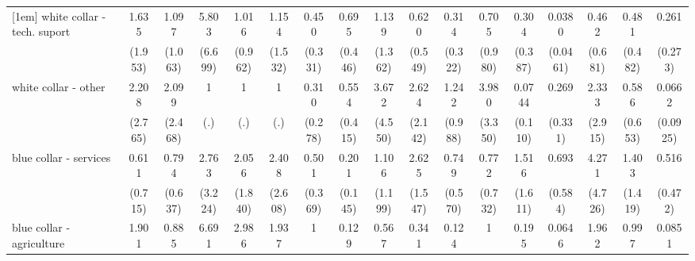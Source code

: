 {\begin{tabular}{l*{16}{c}}
[1em]
white collar - tech. suport&       1.635         &       1.097         &       5.803         &       1.016         &       1.154         &       0.450         &       0.695         &       1.139         &       0.620         &       0.314         &       0.705         &       0.304         &      0.0380\sym{**} &       0.462         &       0.481         &       0.261         \\
                    &     (1.953)         &     (1.063)         &     (6.699)         &     (0.962)         &     (1.532)         &     (0.331)         &     (0.446)         &     (1.362)         &     (0.549)         &     (0.322)         &     (0.980)         &     (0.387)         &    (0.0461)         &     (0.681)         &     (0.482)         &     (0.273)         \\
[1em]
white collar - other&       2.208         &       2.099         &           1         &           1         &           1         &       0.310         &       0.554         &       3.672         &       2.624         &       1.242         &       3.980         &      0.0744         &       0.269         &       2.333         &       0.586         &      0.0662         \\
                    &     (2.765)         &     (2.468)         &         (.)         &         (.)         &         (.)         &     (0.278)         &     (0.415)         &     (4.550)         &     (2.142)         &     (0.988)         &     (3.350)         &     (0.110)         &     (0.331)         &     (2.915)         &     (0.653)         &    (0.0925)         \\
[1em]
blue collar - services&       0.611         &       0.794         &       2.763         &       2.056         &       2.408         &       0.501         &       0.201\sym{*}  &       1.106         &       2.625         &       0.749         &       0.772         &       1.516         &       0.693         &       4.271         &       1.403         &       0.516         \\
                    &     (0.715)         &     (0.637)         &     (3.224)         &     (1.840)         &     (2.608)         &     (0.369)         &     (0.145)         &     (1.199)         &     (1.547)         &     (0.570)         &     (0.732)         &     (1.611)         &     (0.584)         &     (4.726)         &     (1.419)         &     (0.472)         \\
[1em]
blue collar - agriculture&       1.901         &       0.885         &       6.691         &       2.986         &       1.937         &           1         &       0.129         &       0.567         &       0.341         &       0.124         &           1         &       0.195         &      0.0646\sym{*}  &       1.962         &       0.997         &      0.0851         \\

\end{tabular}}
